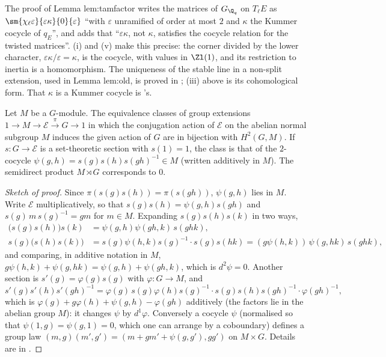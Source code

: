 \begin{paperlink}\label{pl:cohomology:corner}
The proof of Lemma lem:tamfactor writes the matrices of $G_{\Q_q}$ on $T_\ell E$ as
$\sm{\chi_\ell\varepsilon}{\varepsilon\kappa}{0}{\varepsilon}$ ``with $\varepsilon$ unramified of order at most $2$ and $\kappa$ the Kummer cocycle of $q_E$'', and adds that
``$\varepsilon\kappa$, not $\kappa$, satisfies the cocycle relation for the twisted matrices''. (i) and (v) make this precise: the
corner divided by the lower character, $\varepsilon\kappa/\varepsilon=\kappa$, is the cocycle, with values in $\Zl(1)$, and its restriction to inertia is a
homomorphism. The uniqueness of the stable line in a non-split
extension, used in Lemma lem:old, is proved in ; (iii) above is its cohomological form. That $\kappa$ is a Kummer cocycle is
's.
\end{paperlink}

\begin{theorem}\label{thm:cohomology:h2-ext}
Let $M$ be a $G$-module. The equivalence classes of group extensions $1\to M\to\mathcal E\xrightarrow{\pi}G\to1$ in which the conjugation action of $\mathcal E$
on the abelian normal subgroup $M$ induces the given action of $G$ are in bijection with $H^2(G,M)$. If $s\colon G\to\mathcal E$ is a set-theoretic section
with $s(1)=1$, the class is that of the $2$-cocycle $\psi(g,h)=s(g)s(h)s(gh)^{-1}\in M$ (written additively in $M$). The semidirect product $M\rtimes G$
corresponds to $0$.
\end{theorem}

\begin{proof}[Sketch of proof]
Since $\pi(s(g)s(h))=\pi(s(gh))$, $\psi(g,h)$ lies in $M$. Write $\mathcal E$ multiplicatively, so that $s(g)s(h)=\psi(g,h)s(gh)$ and $s(g)\,m\,s(g)^{-1}=gm$ for
$m\in M$. Expanding $s(g)s(h)s(k)$ in two ways,
\begin{align*}
\bigl(s(g)s(h)\bigr)s(k)&=\psi(g,h)\psi(gh,k)\,s(ghk),\\
s(g)\bigl(s(h)s(k)\bigr)&=s(g)\psi(h,k)s(g)^{-1}\cdot s(g)s(hk)=(g\psi(h,k))\,\psi(g,hk)\,s(ghk),
\end{align*}
and comparing, in additive notation in $M$, $g\psi(h,k)+\psi(g,hk)=\psi(g,h)+\psi(gh,k)$, which is $d^2\psi=0$. Another section is $s'(g)=\varphi(g)s(g)$ with
$\varphi\colon G\to M$, and
\[
s'(g)s'(h)s'(gh)^{-1}=\varphi(g)\,s(g)\varphi(h)s(g)^{-1}\cdot s(g)s(h)s(gh)^{-1}\cdot\varphi(gh)^{-1},
\]
which is $\varphi(g)+g\varphi(h)+\psi(g,h)-\varphi(gh)$ additively (the factors lie in the abelian group $M$): it changes $\psi$ by $d^1\varphi$. Conversely a cocycle $\psi$ (normalised so that $\psi(1,g)=\psi(g,1)=0$, which one can arrange by a
coboundary) defines a group law $(m,g)(m',g')=(m+gm'+\psi(g,g'),gg')$ on $M\times G$. Details are in \cite[Chapter IV, Section 3]{Brown}.
\end{proof}

